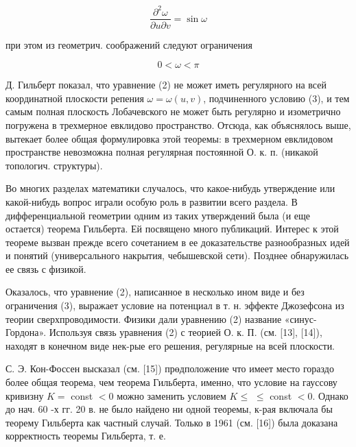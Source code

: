 \documentclass[10pt]{article}
\begin{document}
\[

\frac{\partial^{2} \omega}{\partial u \partial v}=\sin \omega

\]



при этом из геометрич. соображений следуют ограничения



\[

0<\omega<\pi

\]



Д. Гильберт показал, что уравнение (2) не может иметь регулярного на всей координатной плоскости репения $\omega=\omega(u, v)$, подчиненного условию (3), и тем самым полная плоскость Лобачевского не может быть регулярно и изометрично погружена в трехмерное евклидово пространство. Отсюда, как объяснялось выше, вытекает более общая формулировка этой теоремы: в трехмерном евклидовом пространстве невозможна полная регулярная постоянной О. к. п. (никакой топологич. структуры).



Во многих разделах математики случалось, что какое-нибудь утверждение или какой-нибудь вопрос играли особую роль в развитии всего раздела. В дифференциальной геометрии одним из таких утверждений была (и еще остается) теорема Гильберта. Ей посвящено много публикаций. Интерес к этой теореме вызван прежде всего сочетанием в ее доказательстве разнообразных идей и понятий (универсального накрытия, чебышевской сети). Позднее обнаружилась ее связь с физикой.



Оказалось, что уравнение (2), написанное в несколько ином виде и без ограничения (3), выражает условие на потенциал в т. н. эффекте Джозефсона из теории сверхпроводимости. Физики дали уравнению (2) название «синус-Гордона». Используя связь уравнения (2) с теорией О. к. П. (см. [13], [14]), находят в конечном виде нек-рые его решения, регулярные на всей плоскости.



С. Э. Кон-Фоссен высказал (см. [15]) прөдположение что имеет место гораздо более общая теорема, чем теорема Гильберта, именно, что условие на гауссову кривизну $K=$ const $<0$ можно заменить условием $K \leqslant$ $\leqslant$ const $<0$. Однако до нач. 60 -х гг. 20 в. не было найдено ни одной теоремы, к-рая включала бы теорему Гильберта как частный случай. Только в 1961 (см. [16]) была доказана корректность теоремы Гильберта, т. е.
\end{document}
